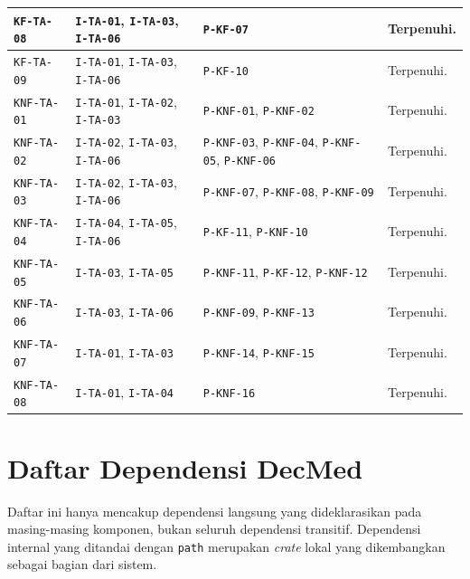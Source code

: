 \documentclass[bahasa, 12pt, a4paper, onecolumn, oneside, final]{report}
\begin{document}
\begin{longtable}{|p{}|p{}|p{}|p{}|}
	\texttt{KF-TA-08}  & \texttt{I-TA-01}, \texttt{I-TA-03}, \texttt{I-TA-06} & \texttt{P-KF-07}                                                           & Terpenuhi.      \\ \hline
	\texttt{KF-TA-09}  & \texttt{I-TA-01}, \texttt{I-TA-03}, \texttt{I-TA-06} & \texttt{P-KF-10}                                                           & Terpenuhi.      \\ \hline
	\texttt{KNF-TA-01} & \texttt{I-TA-01}, \texttt{I-TA-02}, \texttt{I-TA-03} & \texttt{P-KNF-01}, \texttt{P-KNF-02}                                       & Terpenuhi.      \\ \hline
	\texttt{KNF-TA-02} & \texttt{I-TA-02}, \texttt{I-TA-03}, \texttt{I-TA-06} & \texttt{P-KNF-03}, \texttt{P-KNF-04}, \texttt{P-KNF-05}, \texttt{P-KNF-06} & Terpenuhi.      \\ \hline
	\texttt{KNF-TA-03} & \texttt{I-TA-02}, \texttt{I-TA-03}, \texttt{I-TA-06} & \texttt{P-KNF-07}, \texttt{P-KNF-08}, \texttt{P-KNF-09}                    & Terpenuhi.      \\ \hline
	\texttt{KNF-TA-04} & \texttt{I-TA-04}, \texttt{I-TA-05}, \texttt{I-TA-06} & \texttt{P-KF-11}, \texttt{P-KNF-10}                                        & Terpenuhi.      \\ \hline
	\texttt{KNF-TA-05} & \texttt{I-TA-03}, \texttt{I-TA-05}                   & \texttt{P-KNF-11}, \texttt{P-KF-12}, \texttt{P-KNF-12}                     & Terpenuhi.      \\ \hline
	\texttt{KNF-TA-06} & \texttt{I-TA-03}, \texttt{I-TA-06}                   & \texttt{P-KNF-09}, \texttt{P-KNF-13}                                       & Terpenuhi.      \\ \hline
	\texttt{KNF-TA-07} & \texttt{I-TA-01}, \texttt{I-TA-03}                   & \texttt{P-KNF-14}, \texttt{P-KNF-15}                                       & Terpenuhi.      \\ \hline
	\texttt{KNF-TA-08} & \texttt{I-TA-01}, \texttt{I-TA-04}                   & \texttt{P-KNF-16}                                                          & Terpenuhi.      \\ \hline
\end{longtable}
\endgroup
\chapter{Daftar Dependensi DecMed}
\label{lampiran:daftar-dependensi-perangkat-lunak}

Daftar ini hanya mencakup dependensi langsung yang dideklarasikan pada masing-masing komponen, bukan seluruh dependensi transitif. Dependensi internal yang ditandai dengan \texttt{path} merupakan \textit{crate} lokal yang dikembangkan sebagai bagian dari sistem.
\end{document}
